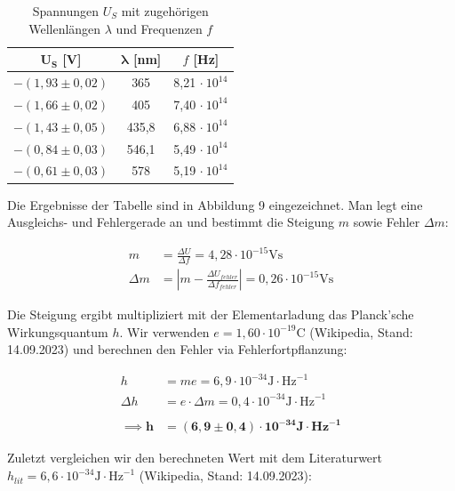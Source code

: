 \documentclass{article}
\begin{document}
\begin{table}[h!]
    \centering
    \begin{tabular}{c|c|c}
    $\bm{U_S}$ [V] & $\bm{\lambda}$ [nm] & $f$ [Hz] \\ \hline
    $-(1,93 \pm 0,02)$ & 365 &  8,21 $\cdot \ 10^{14}$ \\
    $-(1,66 \pm 0,02)$ & 405 & 7,40 $\cdot \ 10^{14}$ \\
    $-(1,43 \pm 0,05)$ & 435,8 & 6,88 $\cdot \ 10^{14}$ \\
    $-(0,84 \pm 0,03)$ & 546,1 & 5,49 $\cdot \ 10^{14}$ \\
    $-(0,61 \pm 0,03)$ & 578 & 5,19 $\cdot \ 10^{14}$ \\
    \end{tabular}
    \caption{Spannungen $U_S$ mit zugehörigen Wellenlängen $\lambda$ und Frequenzen $f$}
\end{table}

Die Ergebnisse der Tabelle sind in Abbildung 9 eingezeichnet. Man legt eine Ausgleichs- und Fehlergerade an und bestimmt die Steigung $m$ sowie Fehler $\Delta m$:

\begin{equation}
    \begin{split}
        m &= \frac{\Delta U}{\Delta f} = 4,28 \cdot 10^{-15} \text{Vs}\\
        \Delta m &= \left| m - \frac{\Delta U_{fehler}}{\Delta f_{fehler}} \right| = 0,26 \cdot 10^{-15}\text{Vs}
    \end{split}
\end{equation}

Die Steigung ergibt multipliziert mit der Elementarladung das Planck'sche Wirkungsquantum $h$. Wir verwenden $e = 1,60 \cdot 10^{-19}$C (Wikipedia, Stand: 14.09.2023) und berechnen den Fehler via Fehlerfortpflanzung:

\begin{equation}
    \begin{split}
        h &= me = 6,9 \cdot 10^{-34} \text{J} \cdot \text{Hz}^{-1} \\
        \Delta h &= e \cdot \Delta m = 0,4 \cdot 10^{-34} \text{J} \cdot \text{Hz}^{-1} \\ \\
        \implies \bm{h} &= \bm{(6,9 \pm 0,4) \cdot 10^{-34} \textbf{J} \cdot \textbf{Hz}^{-1}} 
    \end{split}
\end{equation}

Zuletzt vergleichen wir den berechneten Wert mit dem Literaturwert $h_{lit} = 6,6\cdot 10^{-34} \text{J} \cdot \text{Hz}^{-1}$ (Wikipedia, Stand: 14.09.2023):
\end{document}
